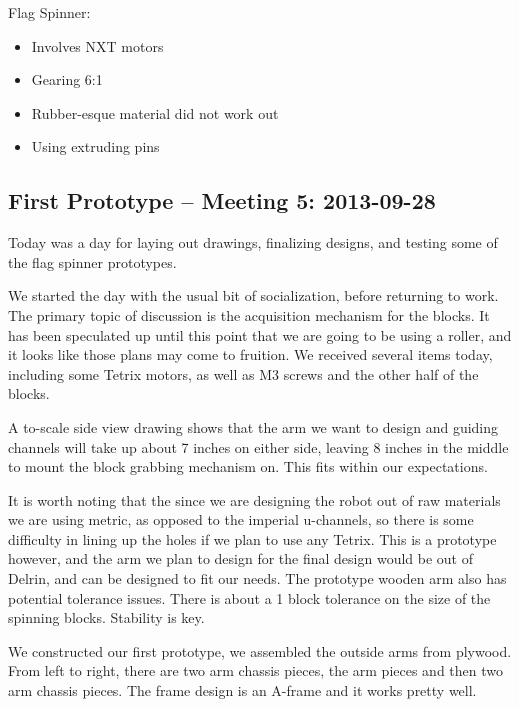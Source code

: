 Flag Spinner:
\begin{itemize}
\item Involves NXT motors
\item Gearing 6:1
\item Rubber-esque material did not work out
\item Using extruding pins
\end{itemize}

\newpage \subsection{First Prototype -- Meeting 5: 2013-09-28}
Today was a day for laying out drawings, finalizing designs, and testing some of the flag spinner prototypes. 

We started the day with the usual bit of socialization, before returning to work. The primary topic of discussion is the acquisition mechanism for the blocks. It has been speculated up until this point that we are going to be using a roller, and it looks like those plans may come to fruition. 
We received several items today, including some Tetrix motors, as well as M3 screws and the other half of the blocks.

A to-scale side view drawing shows that the arm we want to design and guiding channels will take up about 7 inches on either side, leaving 8 inches in the middle to mount the block grabbing mechanism on. This fits within our expectations.

It is worth noting that the since we are designing the robot out of raw materials we are using metric, as opposed to the imperial u-channels, so there is some difficulty in lining up the holes if we plan to use any Tetrix. This is a prototype however, and the arm we plan to design for the final design would be out of Delrin, and can be designed to fit our needs. The prototype wooden arm also has potential tolerance issues. There is about a 1 block tolerance on the size of the spinning blocks. Stability is key. 

We constructed our first prototype, we assembled the outside arms from plywood. From left to right, there are two arm chassis pieces, the arm pieces and then two arm chassis pieces. The frame design is an A-frame and it works pretty well.

